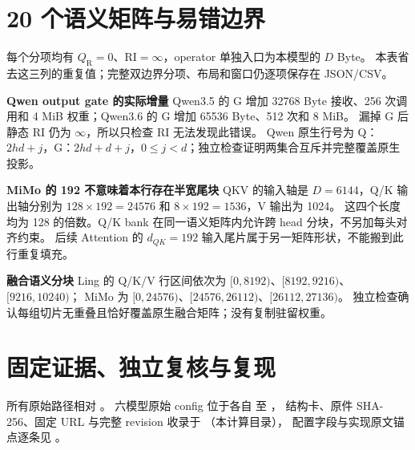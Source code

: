 \documentclass[11pt,a4paper,fontset=fandol]{ctexart}
\newcommand{\qr}{Q_{\mathrm R}}
\newcommand{\RI}{\mathrm{RI}}
\newcommand{\para}[1]{\par\smallskip\noindent\textbf{#1}\quad}
\begin{document}
\clearpage
\section{20 个语义矩阵与易错边界}
\begin{center}\small

\end{center}
\noindent 每个分项均有 $\qr=0$、$\RI=\infty$，operator 单独入口为本模型的 $D$ Byte。
本表省去这三列的重复值；完整双边界分项、布局和窗口仍逐项保存在 JSON/CSV。

\para{Qwen output gate 的实际增量}
Qwen3.5 的 G 增加 32768 Byte 接收、256 次调用和 4 MiB 权重；Qwen3.6 的 G 增加 65536 Byte、512 次和 8 MiB。
漏掉 G 后静态 RI 仍为 $\infty$，所以只检查 RI 无法发现此错误。
Qwen 原生行号为 Q：$2hd+j$，G：$2hd+d+j$，$0\le j<d$；独立检查证明两集合互斥并完整覆盖原生投影。

\para{MiMo 的 192 不意味着本行存在半宽尾块}
QKV 的输入轴是 $D=6144$，Q/K 输出轴分别为 $128\times192=24576$ 和 $8\times192=1536$，V 输出为 1024。
这四个长度均为 128 的倍数。Q/K bank 在同一语义矩阵内允许跨 head 分块，不另加每头对齐约束。
后续 Attention 的 $d_{QK}=192$ 输入尾片属于另一矩阵形状，不能搬到此行重复填充。

\para{融合语义分块}
Ling 的 Q/K/V 行区间依次为 $[0,8192)$、$[8192,9216)$、$[9216,10240)$；
MiMo 为 $[0,24576)$、$[24576,26112)$、$[26112,27136)$。
独立检查确认每组切片无重叠且恰好覆盖原生融合矩阵；没有复制驻留权重。

\clearpage
\section{固定证据、独立复核与复现}
所有原始路径相对 。
六模型原始 config 位于各自  至 ，
结构卡、原件 SHA-256、固定 URL 与完整 revision 收录于 （本计算目录），
配置字段与实现原文锚点逐条见 。
\end{document}
